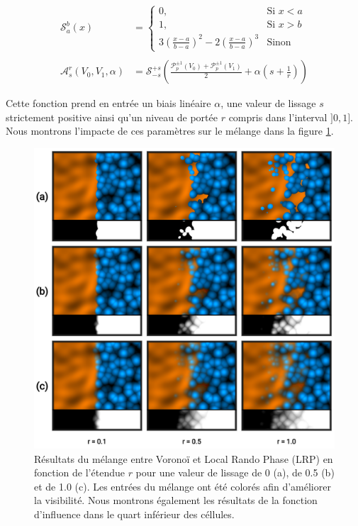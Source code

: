 \documentclass[9pt, twocolumn]{article} %
\begin{document}
\begin{equation}
  \begin{split}
    \mathcal S^b_a(x) &=
    \begin{cases}
      0,                                                                      & \text{Si } x < a \\
      1,                                                                      & \text{Si } x > b \\
      3\left(\frac{x - a}{b - a}\right)^2-2\left(\frac{x - a}{b - a}\right)^3 & \text{Sinon}
    \end{cases}
    \\
    \\
    \mathcal{A}^r_s(V_0, V_1, \alpha)  &= \mathcal S^{+s}_{-s}\left(
    \frac{\mathcal P_p^{\pm 1}(V_0) +\mathcal P_p^{\pm 1}(V_1)}{2}+ \alpha\left(s + \frac{1}{r}\right)\right)
  \end{split}
\end{equation}

Cette fonction prend en entrée un biais linéaire $\alpha$, une valeur de
lissage $s$ strictement positive ainsi qu'un niveau de portée $r$ compris dans
l'interval $]0, 1]$. Nous montrons l'impacte de ces paramètres sur le mélange
dans la figure \ref{fig::MixMax_RangeSmoothnessAlpha}.

\begin{figure}
  \includegraphics[width=\linewidth]{figures/MixMax_Range_Smoothness_Alpha.png}
  \caption{
    Résultats du mélange entre Voronoï et Local Rando Phase (LRP) en fonction de l'étendue $r$ pour une valeur de lissage de 0 (a), de 0.5 (b) et de 1.0 (c). Les entrées du mélange ont été colorés afin d'améliorer la visibilité. Nous montrons également les résultats de la fonction d'influence dans le quart inférieur des céllules.
  }
  \label{fig::MixMax_RangeSmoothnessAlpha}
\end{figure}
\end{document}
